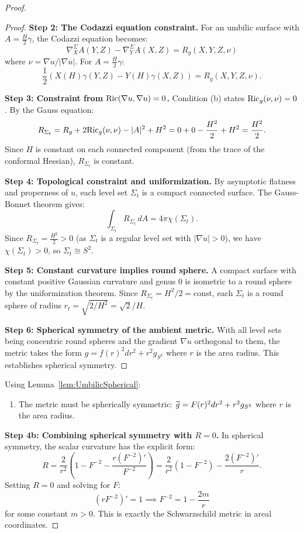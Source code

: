 \begin{proof}
\begin{proof}
\textbf{Step 2: The Codazzi equation constraint.} For an umbilic surface with $A = \frac{H}{2}\gamma$, the Codazzi equation becomes:
\[
\nabla_X^{\Sigma} A(Y,Z) - \nabla_Y^{\Sigma} A(X,Z) = R_g(X,Y,Z,\nu)
\]
where $\nu = \nabla u / |\nabla u|$. For $A = \frac{H}{2}\gamma$:
\[
\frac{1}{2}(X(H)\gamma(Y,Z) - Y(H)\gamma(X,Z)) = R_g(X,Y,Z,\nu).
\]

\textbf{Step 3: Constraint from $\mathrm{Ric}(\nabla u, \nabla u) = 0$.} Condition (b) states $\mathrm{Ric}_g(\nu, \nu) = 0$. By the Gauss equation:
\[
R_{\Sigma_t} = R_g + 2\mathrm{Ric}_g(\nu,\nu) - |A|^2 + H^2 = 0 + 0 - \frac{H^2}{2} + H^2 = \frac{H^2}{2}.
\]
Since $H$ is constant on each connected component (from the trace of the conformal Hessian), $R_{\Sigma_t}$ is constant.

\textbf{Step 4: Topological constraint and uniformization.} By asymptotic flatness and properness of $u$, each level set $\Sigma_t$ is a compact connected surface. The Gauss-Bonnet theorem gives:
\[
\int_{\Sigma_t} R_{\Sigma_t} \, dA = 4\pi \chi(\Sigma_t).
\]
Since $R_{\Sigma_t} = \frac{H^2}{2} > 0$ (as $\Sigma_t$ is a regular level set with $|\nabla u| > 0$), we have $\chi(\Sigma_t) > 0$, so $\Sigma_t \cong S^2$.

\textbf{Step 5: Constant curvature implies round sphere.} A compact surface with constant positive Gaussian curvature and genus 0 is isometric to a round sphere by the uniformization theorem. Since $R_{\Sigma_t} = H^2/2 = \text{const}$, each $\Sigma_t$ is a round sphere of radius $r_t = \sqrt{2/H^2} = \sqrt{2}/H$.

\textbf{Step 6: Spherical symmetry of the ambient metric.} With all level sets being concentric round spheres and the gradient $\nabla u$ orthogonal to them, the metric takes the form $g = f(r)^2 dr^2 + r^2 g_{S^2}$ where $r$ is the area radius. This establishes spherical symmetry.
\end{proof}

Using Lemma~\ref{lem:UmbilicSpherical}:
\begin{enumerate}
    \item[(iii)] The metric must be spherically symmetric: $\widetilde{g} = F(r)^2 dr^2 + r^2 g_{S^2}$ where $r$ is the area radius.
\end{enumerate}

\textbf{Step 4b: Combining spherical symmetry with $R = 0$.}
In spherical symmetry, the scalar curvature has the explicit form:
\begin{equation}
    R = \frac{2}{r^2}\left(1 - F^{-2} - \frac{r(F^{-2})'}{F^{-2}}\right) = \frac{2}{r^2}\left(1 - F^{-2}\right) - \frac{2(F^{-2})'}{r}.
\end{equation}
Setting $R = 0$ and solving for $F$:
\begin{equation}
    (rF^{-2})' = 1 \implies F^{-2} = 1 - \frac{2m}{r}
\end{equation}
for some constant $m > 0$. This is exactly the Schwarzschild metric in areal coordinates.


\end{proof}
